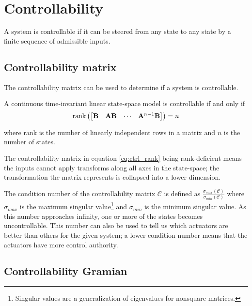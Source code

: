 \section{Controllability}

A \gls{system} is controllable if it can be steered from any \gls{state} to any
\gls{state} by a finite sequence of admissible \glspl{input}.

\subsection{Controllability matrix}

The controllability matrix can be used to determine if a system is controllable.
\begin{theorem}[Controllability]
  A continuous \gls{time-invariant} linear state-space \gls{model} is
  controllable if and only if
  \begin{equation}
    \operatorname{rank}\left(
    \begin{bmatrix}
      \mathbf{B} & \mathbf{A}\mathbf{B} & \cdots & \mathbf{A}^{n-1}\mathbf{B}
    \end{bmatrix}
    \right) = n
    \label{eq:ctrl_rank}
  \end{equation}

  where rank is the number of linearly independent rows in a matrix and $n$ is
  the number of \glspl{state}.
\end{theorem}

The controllability matrix in equation \eqref{eq:ctrl_rank} being rank-deficient
means the \glspl{input} cannot apply transforms along all axes in the
state-space; the transformation the matrix represents is collapsed into a lower
dimension.

The condition number of the controllability matrix $\mathcal{C}$ is defined as
$\frac{\sigma_{max}(\mathcal{C})}{\sigma_{min}(\mathcal{C})}$ where
$\sigma_{max}$ is the maximum singular
value\footnote{\label{footn:singular_val}Singular values are a generalization of
eigenvalues for nonsquare matrices.} and $\sigma_{min}$ is the minimum singular
value. As this number approaches infinity, one or more of the \glspl{state}
becomes uncontrollable. This number can also be used to tell us which actuators
are better than others for the given \gls{system}; a lower condition number
means that the actuators have more control authority.

\subsection{Controllability Gramian}

